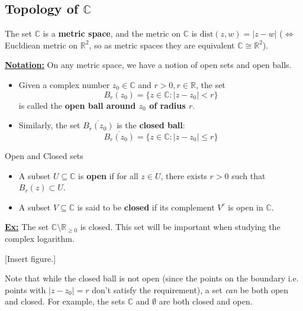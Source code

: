 \documentclass{article}
\newcommand{\R}{\mathbb{R}}
\newcommand{\C}{\mathbb{C}}
\begin{document}
\vskip 1cm
\subsection{Topology of $\C$}
The set $\C$ is a \textbf{metric space}, and the metric on $\C$ is $\text{dist}(z, w) = |z - w|$ ($\iff$ Eucldiean metric on $\R^2$, so as metric spaces they are equivalent $\C \cong \R^2$).

\vskip 0.5cm
\underline{\textbf{Notation:}} On any metric space, we have a notion of open sets and open balls. 

\begin{itemize}
  \item Given a complex number $z_0 \in \C$ and $r > 0, r \in \R$, the set
  \[ B_{r} (z_0) = \{ z \in \C : |z - z_0| < r \} \]
  is called the \textbf{open ball around $z_0$ of radius $r$}. 

  \vskip 0.5cm
  \item Similarly, the set $\overline{B_r (z_0)}$ is the \textbf{closed ball}:
  \[ \overline{B_r (z_0)} = \{ z \in \C : |z - z_0| \leq r \} \]
\end{itemize}

\vskip 0.5cm
\begin{mathdefinitionbox}{Open and Closed sets}
\vskip 0.5cm
  \begin{itemize}
    \item A subset $U \subseteq \C$ is \textbf{open} if for all $z \in U$, there exists $r > 0$ such that $B_r (z) \subset U$.
    
    \item A subset $V \subseteq \C$ is said to be \textbf{closed} if its complement $V^c$ is open in $\C$.
  \end{itemize}
\end{mathdefinitionbox}



\vskip 0.5cm
\underline{\textbf{Ex:}} The set $\C \setminus \R_{\geq 0}$ is closed. This set will be important when studying the complex logarithm.


[Insert figure.]

\vskip 0.5cm
Note that while the closed ball is not open (since the points on the boundary i.e. points with $|z - z_0| = r$ don't satisfy the requirement), a set \emph{can} be both open and closed. For example, the sets $\C$ and $\emptyset$ are both closed and open.

\end{document}
